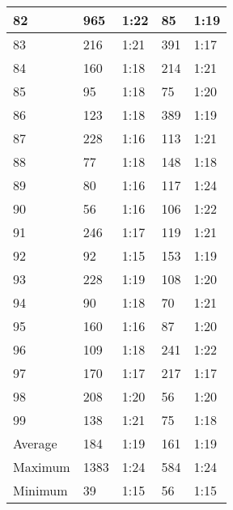 \begin{center}
\begin{longtable}{|p{2cm}|l|l|l|l|}
82      & 965 	  & 1:22	&	85     & 1:19 \\ \hline
83      & 216 	  & 1:21	&	391    & 1:17 \\ \hline
84      & 160 	  & 1:18	&	214    & 1:21 \\ \hline
85      & 95  	  & 1:18	&	75     & 1:20 \\ \hline
86      & 123 	  & 1:18	&	389    & 1:19 \\ \hline
87      & 228 	  & 1:16	&	113    & 1:21 \\ \hline
88      & 77  	  & 1:18	&	148    & 1:18 \\ \hline
89      & 80  	  & 1:16	&	117    & 1:24 \\ \hline
90      & 56  	  & 1:16	&	106    & 1:22 \\ \hline
91      & 246 	  & 1:17	&	119    & 1:21 \\ \hline
92      & 92  	  & 1:15	&	153    & 1:19 \\ \hline
93      & 228 	  & 1:19	&	108    & 1:20 \\ \hline
94      & 90  	  & 1:18	&	70     & 1:21 \\ \hline
95      & 160 	  & 1:16	&	87     & 1:20 \\ \hline
96      & 109 	  & 1:18	&	241    & 1:22 \\ \hline
97      & 170 	  & 1:17	&	217    & 1:17 \\ \hline
98      & 208 	  & 1:20	&	56     & 1:20 \\ \hline
99      & 138 	  & 1:21	&	75     & 1:18 \\ \hline
Average & 184     & 1:19	&	161    & 1:19 \\ \hline
Maximum	& 1383	  & 1:24    &	584    & 1:24 \\ \hline
Minimum	& 39	  & 1:15    &	56	   & 1:15 \\ \hline

		\hline
	\end{longtable}
\end{center}

